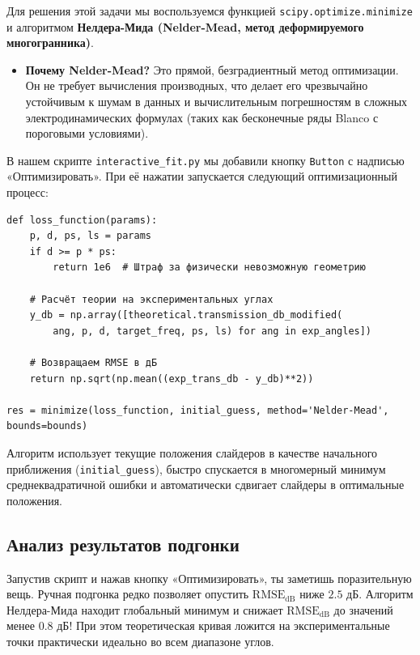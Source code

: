 Для решения этой задачи мы воспользуемся функцией \texttt{scipy.optimize.minimize} и алгоритмом \textbf{Нелдера-Мида (Nelder-Mead, метод деформируемого многогранника)}.
\begin{itemize}
    \item \textbf{Почему Nelder-Mead?} Это прямой, безградиентный метод оптимизации. Он не требует вычисления производных, что делает его чрезвычайно устойчивым к шумам в данных и вычислительным погрешностям в сложных электродинамических формулах (таких как бесконечные ряды Blanco с пороговыми условиями).
\end{itemize}

В нашем скрипте \texttt{interactive\_fit.py} мы добавили кнопку \texttt{Button} с надписью «Оптимизировать». При её нажатии запускается следующий оптимизационный процесс:
\begin{verbatim}
def loss_function(params):
    p, d, ps, ls = params
    if d >= p * ps:
        return 1e6  # Штраф за физически невозможную геометрию
    
    # Расчёт теории на экспериментальных углах
    y_db = np.array([theoretical.transmission_db_modified(
        ang, p, d, target_freq, ps, ls) for ang in exp_angles])
    
    # Возвращаем RMSE в дБ
    return np.sqrt(np.mean((exp_trans_db - y_db)**2))

res = minimize(loss_function, initial_guess, method='Nelder-Mead', bounds=bounds)
\end{verbatim}

Алгоритм использует текущие положения слайдеров в качестве начального приближения (\texttt{initial\_guess}), быстро спускается в многомерный минимум среднеквадратичной ошибки и автоматически сдвигает слайдеры в оптимальные положения.

\subsection{Анализ результатов подгонки}

Запустив скрипт и нажав кнопку «Оптимизировать», ты заметишь поразительную вещь. Ручная подгонка редко позволяет опустить $\text{RMSE}_{\text{dB}}$ ниже $2.5$ дБ. Алгоритм Нелдера-Мида находит глобальный минимум и снижает $\text{RMSE}_{\text{dB}}$ до значений менее $0.8$ дБ! При этом теоретическая кривая ложится на экспериментальные точки практически идеально во всем диапазоне углов.

